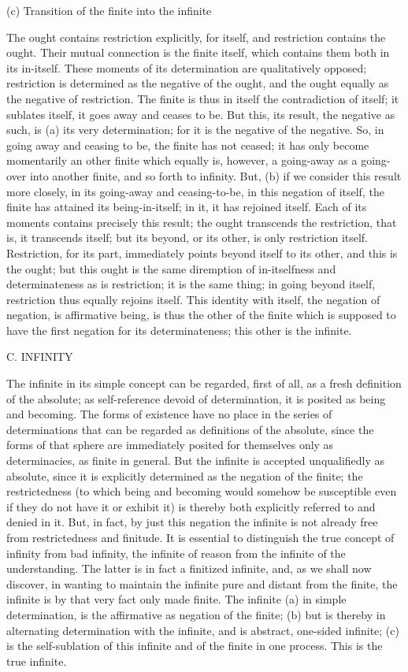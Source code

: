 (c) Transition of the finite into the infinite

The ought contains restriction explicitly, for itself,
and restriction contains the ought.
Their mutual connection is the finite itself,
which contains them both in its in-itself.
These moments of its determination are qualitatively opposed;
restriction is determined as the negative of the ought,
and the ought equally as the negative of restriction.
The finite is thus in itself the contradiction of itself;
it sublates itself, it goes away and ceases to be.
But this, its result, the negative as such,
is (a) its very determination;
for it is the negative of the negative.
So, in going away and ceasing to be,
the finite has not ceased;
it has only become momentarily
an other finite which equally is,
however, a going-away as a going-over
into another finite, and so forth to infinity.
But, (b) if we consider this result more closely,
in its going-away and ceasing-to-be,
in this negation of itself,
the finite has attained its being-in-itself;
in it, it has rejoined itself.
Each of its moments contains precisely this result;
the ought transcends the restriction,
that is, it transcends itself;
but its beyond, or its other, is only restriction itself.
Restriction, for its part, immediately points
beyond itself to its other,
and this is the ought;
but this ought is the same
diremption of in-itselfness and determinateness
as is restriction;
it is the same thing;
in going beyond itself,
restriction thus equally rejoins itself.
This identity with itself, the negation of negation,
is affirmative being, is thus the other of the finite
which is supposed to have the first negation
for its determinateness;
this other is the infinite.

C. INFINITY

The infinite in its simple concept can be regarded, first of all,
as a fresh definition of the absolute;
as self-reference devoid of determination,
it is posited as being and becoming.
The forms of existence have no place in the
series of determinations that can be regarded as definitions of the absolute,
since the forms of that sphere are immediately posited for themselves
only as determinacies, as finite in general.
But the infinite is accepted
unqualifiedly as absolute,
since it is explicitly determined
as the negation of the finite;
the restrictedness
(to which being and becoming would
somehow be susceptible even if they do not have it or exhibit it)
is thereby both explicitly referred to and denied in it.
But, in fact, by just this negation the infinite is
not already free from restrictedness and finitude.
It is essential to distinguish
the true concept of infinity
from bad infinity,
the infinite of reason from
the infinite of the understanding.
The latter is in fact a finitized infinite,
and, as we shall now discover,
in wanting to maintain the infinite
pure and distant from the finite,
the infinite is by that very fact only made finite.
The infinite
(a) in simple determination,
is the affirmative as negation of the finite;
(b) but is thereby in alternating determination with the infinite,
and is abstract, one-sided infinite;
(c) is the self-sublation of this infinite
and of the finite in one process.
This is the true infinite.

